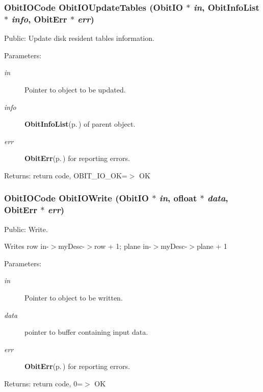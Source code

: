 \subsubsection{\setlength{\rightskip}{0pt plus 5cm}Obit\-IOCode Obit\-IOUpdate\-Tables ({\bf Obit\-IO} $\ast$ {\em in}, {\bf Obit\-Info\-List} $\ast$ {\em info}, {\bf Obit\-Err} $\ast$ {\em err})}\label{ObitIO_8c_a31}


Public: Update disk resident tables information. 

\begin{Desc}
\item[Parameters:]
\begin{description}
\item[{\em in}]Pointer to object to be updated. \item[{\em info}]{\bf Obit\-Info\-List}{\rm (p.\,\pageref{structObitInfoList})} of parent object. \item[{\em err}]{\bf Obit\-Err}{\rm (p.\,\pageref{structObitErr})} for reporting errors. \end{description}
\end{Desc}
\begin{Desc}
\item[Returns:]return code, OBIT\_\-IO\_\-OK=$>$ OK \end{Desc}
\subsubsection{\setlength{\rightskip}{0pt plus 5cm}Obit\-IOCode Obit\-IOWrite ({\bf Obit\-IO} $\ast$ {\em in}, {\bf ofloat} $\ast$ {\em data}, {\bf Obit\-Err} $\ast$ {\em err})}\label{ObitIO_8c_a23}


Public: Write. 

Writes row in-$>$my\-Desc-$>$row + 1; plane in-$>$my\-Desc-$>$plane + 1 \begin{Desc}
\item[Parameters:]
\begin{description}
\item[{\em in}]Pointer to object to be written. \item[{\em data}]pointer to buffer containing input data. \item[{\em err}]{\bf Obit\-Err}{\rm (p.\,\pageref{structObitErr})} for reporting errors. \end{description}
\end{Desc}
\begin{Desc}
\item[Returns:]return code, 0=$>$ OK \end{Desc}
